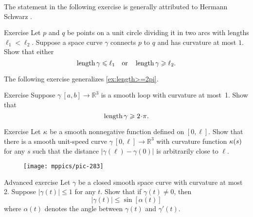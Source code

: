 The statement in the following exercise is generally attributed to Hermann Schwarz \cite{shur}.

\begin{thm}{Exercise}\label{ex:schwartz}
Let $p$ and $q$ be points on a unit circle dividing it in two arcs with lengths $\ell_1<\ell_2$.
Suppose a space curve $\gamma$ connects $p$ to $q$ and has curvature at most $1$.
Show that either
\[\mathop{\rm length}\nolimits \gamma\leqslant \ell_1
\quad\text{or}\quad
\mathop{\rm length}\nolimits \gamma\geqslant \ell_2.
\]
\end{thm}

The following exercise generalizes \ref{ex:length>=2pi}.

\begin{thm}{Exercise}\label{ex:loop}
Suppose $\gamma\:[a,b]\to \mathbb{R}^3$ is a smooth loop with curvature at most~1.
Show that 
\[\length\gamma\ge2\cdot\pi.\]

\end{thm}

\begin{thm}{Exercise}\label{ex:bow-upper}
Let $\kappa$ be a smooth nonnegative function defined on $[0,\ell]$.
Show that there is a smooth unit-speed curve $\gamma\:[0,\ell]\to\mathbb{R}^3$ with curvature function $\kappa(s)$ for any $s$ such that the distance $|\gamma(\ell)-\gamma(0)|$ is arbitrarily close to $\ell$.
\end{thm}

\begin{wrapfigure}{r}{39 mm}
\vskip-4mm
\centering
\texttt{[image: mppics/pic-283]}
\vskip0mm
\end{wrapfigure}

\begin{thm}{Advanced exercise}\label{ex:gromov-twist}
Let $\gamma$ be a closed smooth space curve with curvature at most 2.
Suppose $|\gamma(t)|\le 1$ for any $t$.
Show that if $\gamma(t)\ne 0$, then 
\[|\gamma(t)| \le \sin [\alpha(t)]\]
where $\alpha(t)$ denotes the angle between  $\gamma(t)$ and $\gamma'(t)$.
\end{thm}

